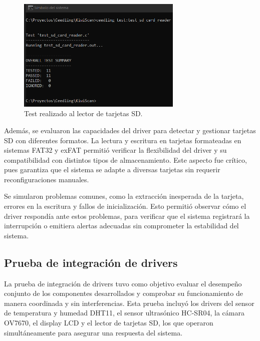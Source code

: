 \vspace{1cm}

\begin{figure}[htbp]
	\centering
	\includegraphics[width=0.7\textwidth, height=0.3\textheight]{./Figures/test_sd_card_reader.png}
	\caption{Test realizado al lector de tarjetas SD.}
	\label{fig:test_sd_card_reader}
\end{figure}

\vspace{1cm}

Además, se evaluaron las capacidades del driver para detectar y gestionar tarjetas SD con diferentes formatos. La lectura y escritura en tarjetas formateadas en sistemas FAT32 y exFAT permitió verificar la flexibilidad del driver y su compatibilidad con distintos tipos de almacenamiento. Este aspecto fue crítico, pues garantiza que el sistema se adapte a diversas tarjetas sin requerir reconfiguraciones manuales.

Se simularon problemas comunes, como la extracción inesperada de la tarjeta, errores en la escritura y fallos de inicialización. Esto permitió observar cómo el driver respondía ante estos problemas, para verificar que el sistema registrará la interrupción o emitiera alertas adecuadas sin comprometer la estabilidad del sistema.

\subsection{Prueba de integración de drivers}

La prueba de integración de drivers tuvo como objetivo evaluar el desempeño conjunto de los componentes desarrollados y comprobar su funcionamiento de manera coordinada y sin interferencias. Esta prueba incluyó los drivers del sensor de temperatura y humedad DHT11, el sensor ultrasónico HC-SR04, la cámara OV7670, el display LCD y el lector de tarjetas SD, los que operaron simultáneamente para asegurar una respuesta del sistema.

